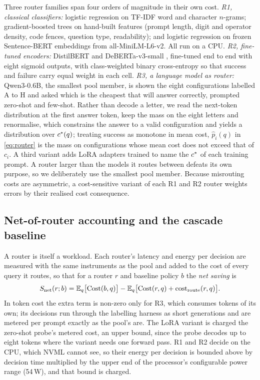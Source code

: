 Three router families span four orders of magnitude in their own cost.
\emph{R1, classical classifiers:} logistic regression on TF-IDF word and
character $n$-grams; gradient-boosted trees
\cite{chen2016xgboost,ke2017lightgbm} on hand-built features (prompt length,
digit and operator density, code fences, question type, readability); and
logistic regression on frozen Sentence-BERT embeddings
\cite{reimers2019sbert} from all-MiniLM-L6-v2. All run
on a CPU. \emph{R2, fine-tuned encoders:} DistilBERT \cite{sanh2019distilbert}
and DeBERTa-v3-small \cite{he2023debertav3}, fine-tuned end to
end with eight sigmoid outputs, with class-weighted binary cross-entropy so
that success and failure carry equal weight in each cell. \emph{R3, a
language model as router:} Qwen3-0.6B, the smallest pool member, is shown the
eight configurations labelled A to H and asked which is the cheapest that
will answer correctly, prompted zero-shot and few-shot. Rather than decode a
letter, we read the next-token distribution at the first answer token, keep
the mass on the eight letters and renormalise, which constrains the answer to
a valid configuration and yields a distribution over $c^{*}(q)$; treating
success as monotone in mean cost, $\hat{p}_i(q)$ in \eqref{eq:router} is the
mass on configurations whose mean cost does not exceed that of $c_i$. A third
variant adds LoRA adapters \cite{hu2022lora} trained to name the $c^{*}$ of
each training prompt. A router larger than the models it routes between
defeats its own purpose, so we deliberately use the smallest pool member.
Because misrouting costs are asymmetric, a cost-sensitive variant of each R1
and R2 router weights errors by their realised cost consequence.

\subsection{Net-of-router accounting and the cascade baseline}
\label{sec:net}

A router is itself a workload. Each router's latency and energy per decision
are measured with the same instruments as the pool and added to the cost of
every query it routes, so that for a router $r$ and baseline policy $b$ the
\emph{net saving} is
\begin{equation}
  S_{\mathrm{net}}(r; b) =
    \mathbb{E}_q\bigl[\mathrm{Cost}(b, q)\bigr]
  - \mathbb{E}_q\bigl[\mathrm{Cost}(r, q) + \mathrm{cost}_{\mathrm{route}}(r, q)\bigr].
  \label{eq:netsaving}
\end{equation}
In token cost the extra term is non-zero only for R3, which consumes tokens
of its own; its decisions run through the labelling harness as short
generations and are metered per prompt exactly as the pool's are. The LoRA
variant is charged the zero-shot probe's metered cost, an upper bound, since
the probe decodes up to eight tokens where the variant needs one forward
pass. R1 and R2 decide on the CPU, which NVML cannot see, so their energy per
decision is bounded above by decision time multiplied by the upper end of the
processor's configurable power range (54\,W), and that bound is charged.

